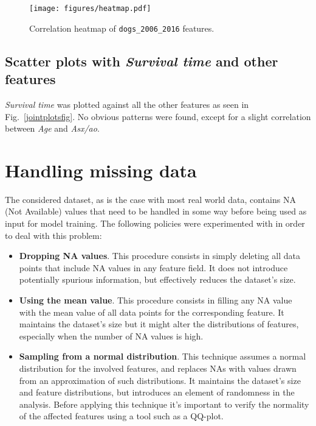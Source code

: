 \documentclass[12pt]{report}
\begin{document}
\begin{figure}[h]
  \centering
  	\texttt{[image: figures/heatmap.pdf]}
  \caption{Correlation heatmap of \texttt{dogs\_2006\_2016} features.}
  \label{corrheatmap}
\end{figure}

\subsection*{Scatter plots with \textit{Survival time} and other features}
\textit{Survival time} was plotted against all the other features as seen in Fig.\ \ref{jointplotsfig}. No obvious patterns were found, except for a slight correlation between \textit{Age} and \textit{Asx/ao}.

\section{Handling missing data}
The considered dataset, as is the case with most real world data, contains NA (Not Available) values that need to be handled in some way before being used as input for model training. The following policies were experimented with in order to deal with this problem:
\begin{itemize}
\item \textbf{Dropping NA values}. This procedure consists in simply deleting all data points that include NA values in any feature field. It does not introduce potentially spurious information, but effectively reduces the dataset's size.
\item \textbf{Using the mean value}. This procedure consists in filling any NA value with the mean value of all data points for the corresponding feature. It maintains the dataset's size but it might alter the distributions of features, especially when the number of NA values is high.
\item \textbf{Sampling from a normal distribution}. This technique assumes a normal distribution for the involved features, and replaces NAs with values drawn from an approximation of such distributions. It maintains the dataset's size and feature distributions, but introduces an element of randomness in the analysis. Before applying this technique it's important to verify the normality of the affected features using a tool such as a QQ-plot.
\end{itemize}
\end{document}
